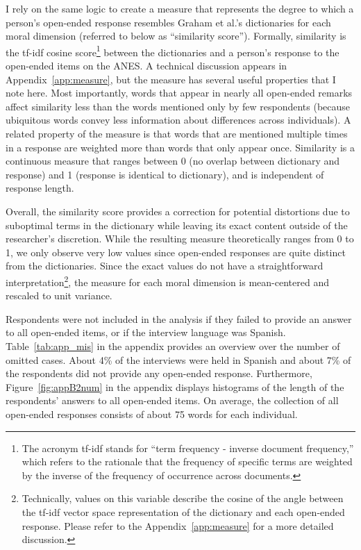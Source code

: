 \documentclass[12pt]{article}
\begin{document}
I rely on the same logic to create a measure that represents the degree to which a person's open-ended response resembles Graham et al.'s \citeyearpar{graham2009liberals} dictionaries for each moral dimension (referred to below as ``similarity score''). Formally, similarity is the tf-idf cosine score\footnote{The acronym tf-idf stands for ``term frequency - inverse document frequency,'' which refers to the rationale that the frequency of specific terms are weighted by the inverse of the frequency of occurrence across documents.} between the dictionaries and a person's response to the open-ended items on the ANES. A technical discussion appears in Appendix~\ref{app:measure}, but the measure has several useful properties that I note here. Most importantly, words that appear in nearly all open-ended remarks affect similarity less than the words mentioned only by few respondents (because ubiquitous words convey less information about differences across individuals). A related property of the measure is that words that are mentioned multiple times in a response are weighted more than words that only appear once. Similarity is a continuous measure that ranges between 0 (no overlap between dictionary and response) and 1 (response is identical to dictionary), and is independent of response length.

Overall, the similarity score provides a correction for potential distortions due to suboptimal terms in the dictionary while leaving its exact content outside of the researcher's discretion. While the resulting measure theoretically ranges from 0 to 1, we only observe very low values since open-ended responses are quite distinct from the dictionaries. Since the exact values do not have a straightforward interpretation\footnote{Technically, values on this variable describe the cosine of the angle between the tf-idf vector space representation of the dictionary and each open-ended response. Please refer to the Appendix~\ref{app:measure} for a more detailed discussion.}, the measure for each moral dimension is mean-centered and rescaled to unit variance.

Respondents were not included in the analysis if they failed to provide an answer to all open-ended items, or if the interview language was Spanish. Table~\ref{tab:app_mis} in the appendix provides an overview over the number of omitted cases. About 4\% of the interviews were held in Spanish and about 7\% of the respondents did not provide any open-ended response. Furthermore, Figure~\ref{fig:appB2num} in the appendix displays histograms of the length of the respondents' answers to all open-ended items. On average, the collection of all open-ended responses consists of about 75 words for each individual.
\end{document}
